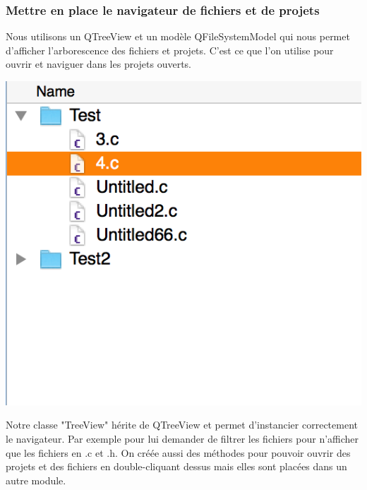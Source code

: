 \documentclass[a4paper,12pt]{article}
\begin{document}
			\subsubsection*{Mettre en place le navigateur de fichiers et de projets}
			 Nous utilisons un QTreeView et un modèle QFileSystemModel qui nous permet d'afficher l'arborescence des fichiers et projets. C'est ce que l'on utilise pour ouvrir et naviguer dans les projets ouverts.\\
			\begin{center}
				\includegraphics[scale=0.6]{images/QTreeView}
				\vspace{0.6cm}
			\end{center}
			Notre classe "TreeView" hérite de QTreeView et permet d'instancier correctement le navigateur. Par exemple pour lui demander de filtrer les fichiers pour n'afficher que les fichiers en .c et .h. On créée aussi des méthodes pour pouvoir ouvrir des projets et des fichiers en double-cliquant dessus mais elles sont placées dans un autre module.\\			
			
			
\end{document}
